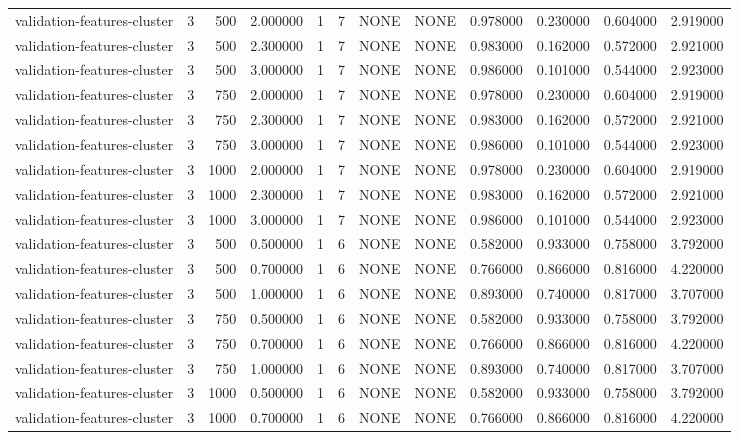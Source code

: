 \begin{tabular}{lrrrllllrrrr}
validation-features-cluster & 3 & 500 & 2.000000 & 1 & 7 & NONE & NONE & 0.978000 & 0.230000 & 0.604000 & 2.919000 \\
validation-features-cluster & 3 & 500 & 2.300000 & 1 & 7 & NONE & NONE & 0.983000 & 0.162000 & 0.572000 & 2.921000 \\
validation-features-cluster & 3 & 500 & 3.000000 & 1 & 7 & NONE & NONE & 0.986000 & 0.101000 & 0.544000 & 2.923000 \\
validation-features-cluster & 3 & 750 & 2.000000 & 1 & 7 & NONE & NONE & 0.978000 & 0.230000 & 0.604000 & 2.919000 \\
validation-features-cluster & 3 & 750 & 2.300000 & 1 & 7 & NONE & NONE & 0.983000 & 0.162000 & 0.572000 & 2.921000 \\
validation-features-cluster & 3 & 750 & 3.000000 & 1 & 7 & NONE & NONE & 0.986000 & 0.101000 & 0.544000 & 2.923000 \\
validation-features-cluster & 3 & 1000 & 2.000000 & 1 & 7 & NONE & NONE & 0.978000 & 0.230000 & 0.604000 & 2.919000 \\
validation-features-cluster & 3 & 1000 & 2.300000 & 1 & 7 & NONE & NONE & 0.983000 & 0.162000 & 0.572000 & 2.921000 \\
validation-features-cluster & 3 & 1000 & 3.000000 & 1 & 7 & NONE & NONE & 0.986000 & 0.101000 & 0.544000 & 2.923000 \\
validation-features-cluster & 3 & 500 & 0.500000 & 1 & 6 & NONE & NONE & 0.582000 & 0.933000 & 0.758000 & 3.792000 \\
validation-features-cluster & 3 & 500 & 0.700000 & 1 & 6 & NONE & NONE & 0.766000 & 0.866000 & 0.816000 & 4.220000 \\
validation-features-cluster & 3 & 500 & 1.000000 & 1 & 6 & NONE & NONE & 0.893000 & 0.740000 & 0.817000 & 3.707000 \\
validation-features-cluster & 3 & 750 & 0.500000 & 1 & 6 & NONE & NONE & 0.582000 & 0.933000 & 0.758000 & 3.792000 \\
validation-features-cluster & 3 & 750 & 0.700000 & 1 & 6 & NONE & NONE & 0.766000 & 0.866000 & 0.816000 & 4.220000 \\
validation-features-cluster & 3 & 750 & 1.000000 & 1 & 6 & NONE & NONE & 0.893000 & 0.740000 & 0.817000 & 3.707000 \\
validation-features-cluster & 3 & 1000 & 0.500000 & 1 & 6 & NONE & NONE & 0.582000 & 0.933000 & 0.758000 & 3.792000 \\
validation-features-cluster & 3 & 1000 & 0.700000 & 1 & 6 & NONE & NONE & 0.766000 & 0.866000 & 0.816000 & 4.220000 \\

\end{tabular}
